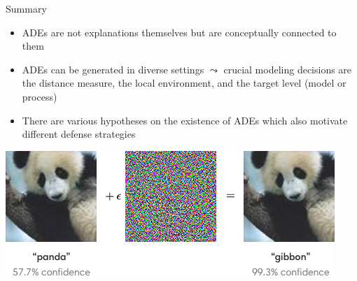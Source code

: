 \documentclass[10pt,compress,t,notes=noshow, xcolor=table]{beamer}
\begin{document}

\begin{vbframe}[c]{Summary}
\begin{itemize}
    \item ADEs are not explanations themselves but are conceptually connected to them
    \item ADEs can be generated in diverse settings $\leadsto$ crucial modeling decisions are the distance measure, the local environment, and the target level (model or process)
    \item There are various hypotheses on the existence of ADEs which also motivate different defense strategies
\end{itemize}
\begin{center}
    \includegraphics[width = .6\textwidth]{figure/AEpanda_simple.png}
    
    {}
\end{center}
\end{vbframe}
\end{document}
